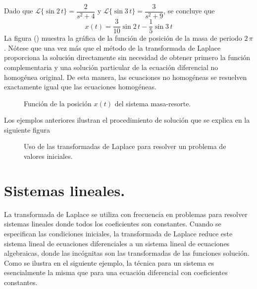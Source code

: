 Dado que $\mathscr{L} \{\sin 2 \, t \} = \dfrac{2}{s^{2} + 4}$ y $\mathscr{L} \{\sin 3 \, t \} = \dfrac{3}{s^{2} + 9}$, se concluye que
\[ x(t) = \dfrac{3}{10} \sin 2 \, t - \dfrac{1}{5} \sin 3 \, t \]
La figura () muestra la gráfica de la función de posición de la masa de periodo $2 \, \pi$. Nótese que una vez más que el método de la transformada de Laplace proporciona la solución directamente sin necesidad de obtener primero la función complementaria y una solución particular de la ecuación diferencial no homogénea original. De esta manera, las ecuaciones no homogéneas se resuelven exactamente igual que las ecuaciones homogéneas.
\begin{figure}[!h]
    \centering
    
    \caption{Función de la posición $x(t)$ del sistema masa-resorte.}
    \label{fig:figura_003}
\end{figure}
Los ejemplos anteriores ilustran el procedimiento de solución que se explica en la siguiente figura
\begin{figure}[H]
    \centering
    
    \caption{Uso de las transformadas de Laplace para resolver un problema de valores iniciales.}
    \label{fig:figura_004}
\end{figure}
\section{Sistemas lineales.}
La transformada de Laplace se utiliza con frecuencia en problemas para resolver sistemas lineales donde todos los coeficientes son constantes. Cuando se especifican las condiciones iniciales, la transformada de Laplace reduce este sistema lineal de ecuaciones diferenciales a un sistema lineal de ecuaciones algebraicas, donde las incógnitas son las transformadas de las funciones solución. Como se ilustra en el siguiente ejemplo, la técnica para un sistema es esencialmente la misma que para una ecuación diferencial con coeficientes constantes.
